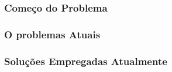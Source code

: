 \begin{frame}
	\frametitle{Começo do Problema}
\end{frame}

\begin{frame}
	\frametitle{O problemas Atuais}
\end{frame}

\begin{frame}
	\frametitle{Soluções Empregadas Atualmente}
\end{frame}